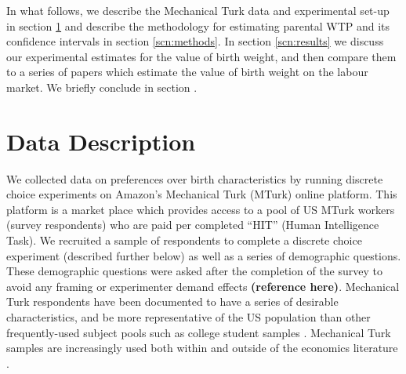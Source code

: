 \documentclass[a4paper, 11pt]{article}
\begin{document}
\begin{spacing}{1.4}
In what follows, we describe the Mechanical Turk data and experimental
set-up in section \ref{scn:data} and describe the methodology for
estimating parental WTP and its confidence intervals in section
\ref{scn:methods}.  In section \ref{scn:results} we discuss our
experimental estimates for the value of birth weight, and then compare
them to a series of papers which estimate the value of birth weight on
the labour market.  We briefly conclude in section \label{scn:conclusion}.

\section{Data Description}
\label{scn:data}
We collected data on preferences over birth characteristics by running
discrete choice experiments on Amazon's Mechanical Turk (MTurk) online platform.
This platform is a market place which provides access to a pool of US MTurk
workers (survey respondents) who are paid per completed ``HIT'' (Human
Intelligence Task).  We recruited a sample of respondents to complete a
discrete choice experiment (described further below) as well as a series of
demographic questions.  These demographic questions were asked after the
completion of the survey to avoid any framing or experimenter demand effects \textbf{(reference here)}.
Mechanical Turk respondents have been documented to have a series of desirable
characteristics, and be more representative of the US population than other
frequently-used subject pools such as college student samples
\citep{Berinskyetal2012}.  Mechanical Turk samples are increasingly used both
within and outside of the economics literature
\citep{Kuziemkoetal2015,Jordanetal2016}.


\end{spacing}
\end{document}
